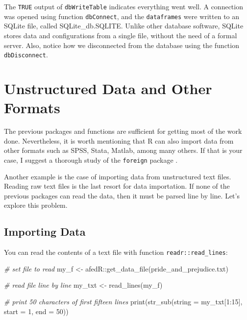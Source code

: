 \documentclass[
  12pt,
]{book}
\newenvironment{Shaded}{\begin{snugshade}}{\end{snugshade}}
\newcommand{\AttributeTok}[1]{\textcolor[rgb]{0.61,0.61,0.61}{#1}}
\newcommand{\CommentTok}[1]{\textcolor[rgb]{0.37,0.37,0.37}{\textit{#1}}}
\newcommand{\DecValTok}[1]{\textcolor[rgb]{0.06,0.06,0.06}{#1}}
\newcommand{\FunctionTok}[1]{\textcolor[rgb]{0,0,0}{#1}}
\newcommand{\NormalTok}[1]{#1}
\newcommand{\OtherTok}[1]{\textcolor[rgb]{0.37,0.37,0.37}{#1}}
\newcommand{\SpecialCharTok}[1]{\textcolor[rgb]{0,0,0}{#1}}
\newcommand{\StringTok}[1]{\textcolor[rgb]{0.5,0.5,0.5}{#1}}
\begin{document}
The \texttt{TRUE} output of \texttt{dbWriteTable} indicates everything went well. A connection was opened using function \texttt{dbConnect}, and the \texttt{dataframes} were written to an SQLite file, called SQLite\_db.SQLITE. Unlike other database software, SQLite stores data and configurations from a single file, without the need of a formal server. Also, notice how we disconnected from the database using the function \texttt{dbDisconnect}.   

\hypertarget{unstructured-data-and-other-formats}{%
\section{Unstructured Data and Other Formats}\label{unstructured-data-and-other-formats}}

The previous packages and functions are sufficient for getting most of the work done. Nevertheless, it is worth mentioning that R can also import data from other formats such as SPSS, Stata, Matlab, among many others. If that is your case, I suggest a thorough study of the \texttt{foreign} package \citep{R-foreign}.

Another example is the case of importing data from unstructured text files. Reading raw text files is the last resort for data importation. If none of the previous packages can read the data, then it must be parsed line by line. Let's explore this problem.

\hypertarget{importing-data-5}{%
\subsection{Importing Data}\label{importing-data-5}}

You can read the contents of a text file with function \texttt{readr::read\_lines}: 

\begin{Shaded}
\begin{Highlighting}[]
\CommentTok{\# set file to read}
\NormalTok{my\_f }\OtherTok{\textless{}{-}}\NormalTok{ afedR}\SpecialCharTok{::}\FunctionTok{get\_data\_file}\NormalTok{(}\StringTok{\textquotesingle{}pride\_and\_prejudice.txt\textquotesingle{}}\NormalTok{)}

\CommentTok{\# read file line by line}
\NormalTok{my\_txt }\OtherTok{\textless{}{-}} \FunctionTok{read\_lines}\NormalTok{(my\_f)}

\CommentTok{\# print 50 characters of first fifteen lines}
\FunctionTok{print}\NormalTok{(}\FunctionTok{str\_sub}\NormalTok{(}\AttributeTok{string =}\NormalTok{ my\_txt[}\DecValTok{1}\SpecialCharTok{:}\DecValTok{15}\NormalTok{], }
              \AttributeTok{start =} \DecValTok{1}\NormalTok{, }
              \AttributeTok{end =} \DecValTok{50}\NormalTok{))}
\end{Highlighting}
\end{Shaded}
\end{document}
